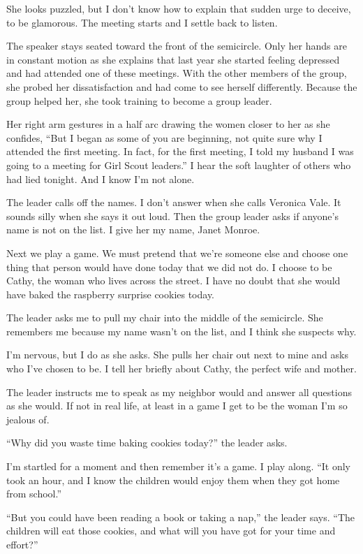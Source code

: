 \documentclass[
]{article}
\begin{document}
She looks puzzled, but I don't know how to explain that sudden urge to
deceive, to be glamor­ous. The meeting starts and I settle back to
listen.

The speaker stays seated toward the front of the semicircle. Only her
hands are in constant motion as she explains that last year she started
feeling depressed and had attended one of these meet­ings. With the
other members of the group, she probed her dissatisfaction and had come
to see her­self differently. Because the group helped her, she took
training to become a group leader.

Her right arm gestures in a half arc drawing the women closer to her as
she confides, ``But I began as some of you are beginning, not quite sure
why I attended the first meeting. In fact, for the first meeting, I told
my husband I was going to a meeting for Girl Scout leaders.'' I hear the
soft laugh­ter of others who had lied tonight. And I know I'm not alone.

The leader calls off the names. I don't answer when she calls Veronica
Vale. It sounds silly when she says it out loud. Then the group leader
asks if anyone's name is not on the list. I give her my name, Janet
Monroe.

Next we play a game. We must pretend that we're someone else and choose
one thing that person would have done today that we did not do. I choose
to be Cathy, the woman who lives across the street. I have no doubt that
she would have baked the raspberry surprise cookies today.

The leader asks me to pull my chair into the middle of the semicircle.
She remembers me because my name wasn't on the list, and I think she
suspects why.

I'm nervous, but I do as she asks. She pulls her chair out next to mine
and asks who I've chosen to be. I tell her briefly about Cathy, the
perfect wife and mother.

The leader instructs me to speak as my neighbor would and answer all
questions as she would. If not in real life, at least in a game I get to
be the woman I'm so jealous of.

``Why did you waste time baking cookies today?'' the leader asks.

I'm startled for a moment and then remember it's a game. I play along.
``It only took an hour, and I know the children would enjoy them when
they got home from school.''

``But you could have been reading a book or taking a nap,'' the leader
says. ``The children will eat those cookies, and what will you have got
for your time and effort?''
\end{document}
